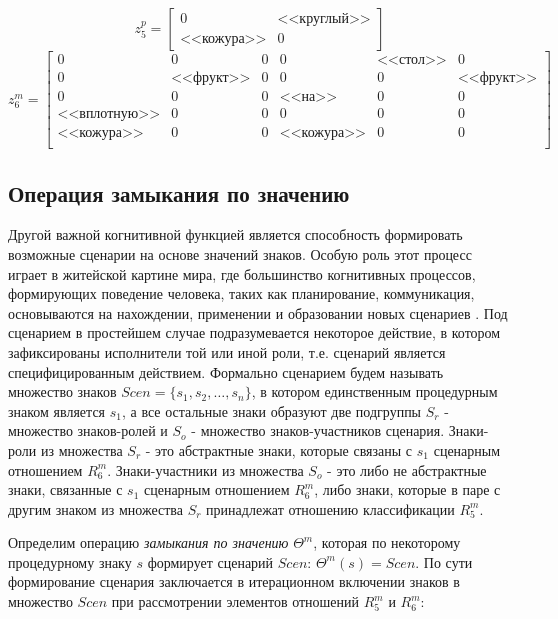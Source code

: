 \documentclass[12pt]{scrartcl}
\begin{document}
	\[
	z_5^p = \begin{bmatrix}
	0& \text{<<круглый>>} \\
	\text{<<кожура>>} &0
	\end{bmatrix}
	\]
	\[
	z_6^m= \left[\begin{array}{ccc|cccc}
	0&0&0&0&\text{<<стол>>}&0\\
	0&\text{<<фрукт>>}&0& 0&0&\text{<<фрукт>>}\\
	0& 0& 0 &\text{<<на>>} &0&0\\
	\text{<<вплотную>>}& 0& 0 &0 &0&0\\
	\text{<<кожура>>} &0 &0 &\text{<<кожура>>}  &0&0\\
	\end{array}
	\right]
	\] 
	
	\subsection{Операция замыкания по значению}
	Другой важной когнитивной функцией является способность формировать возможные сценарии на основе значений знаков. Особую роль этот процесс играет в житейской картине мира, где большинство когнитивных процессов, формирующих поведение человека, таких как планирование, коммуникация, основываются на нахождении, применении и образовании новых сценариев \cite{Chudova2012b,Osipov2015d}. Под сценарием в простейшем случае подразумевается некоторое действие, в котором зафиксированы исполнители той или иной роли, т.е. сценарий является специфицированным действием. Формально сценарием будем называть множество знаков $Scen=\{s_1,s_2,\dots, s_n\}$, в котором единственным процедурным знаком является $s_1$, а все остальные знаки образуют две подгруппы $S_r$ - множество знаков-ролей и $S_o$ - множество знаков-участников сценария. Знаки-роли из множества $S_r$ - это абстрактные знаки, которые связаны с $s_1$ сценарным отношением $R_6^m$. Знаки-участники из множества $S_o$ - это либо не абстрактные знаки, связанные с $s_1$ сценарным отношением $R_6^m$, либо знаки, которые в паре с другим знаком из множества $S_r$ принадлежат отношению классификации $R_5^m$.
	
	Определим операцию \textit{замыкания по значению} $\Theta^m$, которая по некоторому процедурному знаку $s$ формирует сценарий $Scen$: $\Theta^m(s)=Scen$. По сути формирование сценария заключается в итерационном включении знаков в множество $Scen$ при рассмотрении элементов отношений $R_5^m$ и $R_6^m$:
	
\end{document}
